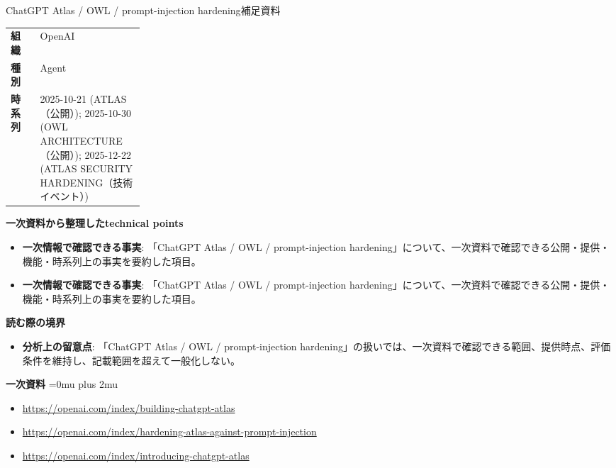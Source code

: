\begin{technicalnote}{ChatGPT Atlas / OWL / prompt-injection hardening}{補足資料}
\begingroup
\begin{tabularx}{\linewidth}{@{}>{\bfseries}p{0.22\linewidth}X@{}}
組織 & OpenAI \\
種別 & Agent \\
時系列 & 2025-10-21 (ATLAS（公開）); 2025-10-30 (OWL ARCHITECTURE（公開）); 2025-12-22 (ATLAS SECURITY HARDENING（技術イベント）) \\
\end{tabularx}
\smallskip
{\bfseries 一次資料から整理したtechnical points}
\begin{itemize}[leftmargin=1.5em,itemsep=0.35em]
\item \textbf{一次情報で確認できる事実}: 「ChatGPT Atlas / OWL / prompt-injection hardening」について、一次資料で確認できる公開・提供・機能・時系列上の事実を要約した項目。
\item \textbf{一次情報で確認できる事実}: 「ChatGPT Atlas / OWL / prompt-injection hardening」について、一次資料で確認できる公開・提供・機能・時系列上の事実を要約した項目。
\end{itemize}
\begin{minipage}{\linewidth}
{\bfseries 読む際の境界}
\begin{itemize}[leftmargin=1.5em,itemsep=0.35em]
\item \textbf{分析上の留意点}: 「ChatGPT Atlas / OWL / prompt-injection hardening」の扱いでは、一次資料で確認できる範囲、提供時点、評価条件を維持し、記載範囲を超えて一般化しない。
\end{itemize}
\begin{samepage}
{\bfseries 一次資料}
\begingroup\sloppy
\Urlmuskip=0mu plus 2mu\relax
\begin{itemize}[leftmargin=1.5em,itemsep=0.25em]
\item {\scriptsize\url{https://openai.com/index/building-chatgpt-atlas}}
\item {\scriptsize\url{https://openai.com/index/hardening-atlas-against-prompt-injection}}
\item {\scriptsize\url{https://openai.com/index/introducing-chatgpt-atlas}}
\end{itemize}
\endgroup
\end{samepage}
\end{minipage}
\endgroup
\end{technicalnote}
\medskip

